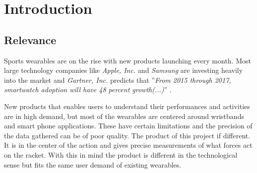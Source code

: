 \chapter{Introduction}

\section*{Relevance}
Sports wearables are on the rise with new products launching every month. 
Most large technology companies like \textit{Apple, Inc.} and \textit{Samsung} are investing heavily into the market and \textit{Gartner, Inc.} predicts that ''\textit{From 2015 through 2017, smartwatch adoption will have 48 percent growth(...)}'' \citep{introduction:relevance:gartner}.

New products that enables users to understand their performances and activities are in high demand, but most of the wearables are centered around wristbands and smart phone applications. 
These have certain limitations and the precision of the data gathered can be of poor quality.
The product of this project if different. 
It is in the center of the action and gives precise measurements of what forces act on the racket.
With this in mind the product is different in the technological sense but fits the same user demand of existing wearables.
